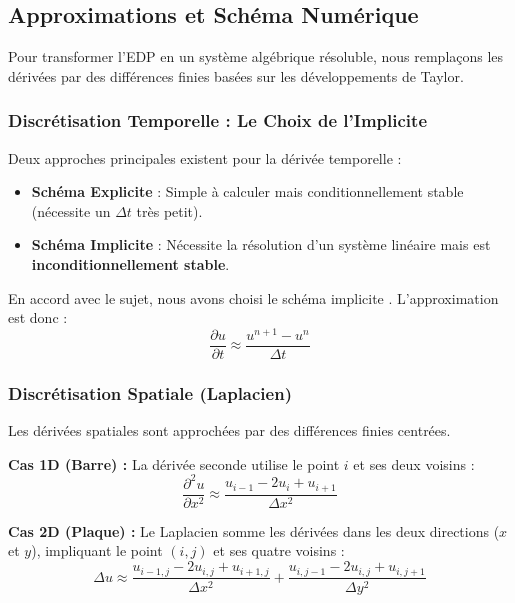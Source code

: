 \documentclass[a4paper,12pt]{article}
\begin{document}
\subsection{Approximations et Schéma Numérique}

Pour transformer l'EDP en un système algébrique résoluble, nous remplaçons les dérivées par des différences finies basées sur les développements de Taylor.

\subsubsection{Discrétisation Temporelle : Le Choix de l'Implicite}
Deux approches principales existent pour la dérivée temporelle :
\begin{itemize}
    \item \textbf{Schéma Explicite} : Simple à calculer mais conditionnellement stable (nécessite un $\Delta t$ très petit).
    \item \textbf{Schéma Implicite} : Nécessite la résolution d'un système linéaire mais est \textbf{inconditionnellement stable}.
\end{itemize}

En accord avec le sujet, nous avons choisi le schéma implicite . L'approximation est donc :
\begin{equation}
    \frac{\partial u}{\partial t} \approx \frac{u^{n+1} - u^n}{\Delta t}
\end{equation}

\subsubsection{Discrétisation Spatiale (Laplacien)}
Les dérivées spatiales sont approchées par des différences finies centrées.

\textbf{Cas 1D (Barre) :} La dérivée seconde utilise le point $i$ et ses deux voisins :
\begin{equation}
    \frac{\partial^2 u}{\partial x^2} \approx \frac{u_{i-1} - 2u_i + u_{i+1}}{\Delta x^2}
\end{equation}

\textbf{Cas 2D (Plaque) :} Le Laplacien somme les dérivées dans les deux directions ($x$ et $y$), impliquant le point $(i,j)$ et ses quatre voisins :
\begin{equation}
    \Delta u \approx \frac{u_{i-1,j} - 2u_{i,j} + u_{i+1,j}}{\Delta x^2} + \frac{u_{i,j-1} - 2u_{i,j} + u_{i,j+1}}{\Delta y^2}
\end{equation}
\end{document}
